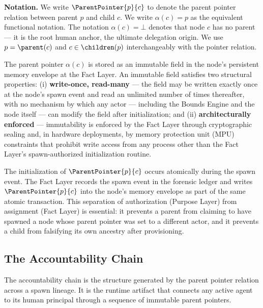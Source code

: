 \noindent\textbf{Notation.} We write $\ParentPointer{p}{c}$ to denote the parent pointer relation between parent $p$ and child $c$. We write $\alpha(c) = p$ as the equivalent functional notation. The notation $\alpha(c) = \bot$ denotes that node $c$ has no parent --- it is the root human anchor, the ultimate delegation origin. We use $p = \parent(c)$ and $c \in \children(p)$ interchangeably with the pointer relation.

The parent pointer $\alpha(c)$ is stored as an immutable field in the node's persistent memory envelope at the Fact Layer. An immutable field satisfies two structural properties: (i) \textbf{write-once, read-many} --- the field may be written exactly once at the node's spawn event and read an unlimited number of times thereafter, with no mechanism by which any actor --- including the Bounds Engine and the node itself --- can modify the field after initialization; and (ii) \textbf{architecturally enforced} --- immutability is enforced by the Fact Layer through cryptographic sealing and, in hardware deployments, by memory protection unit (MPU) constraints that prohibit write access from any process other than the Fact Layer's spawn-authorized initialization routine.

The initialization of $\ParentPointer{p}{c}$ occurs atomically during the spawn event. The Fact Layer records the spawn event in the forensic ledger and writes $\ParentPointer{p}{c}$ into the node's memory envelope as part of the same atomic transaction. This separation of authorization (Purpose Layer) from assignment (Fact Layer) is essential: it prevents a parent from claiming to have spawned a node whose parent pointer was set to a different actor, and it prevents a child from falsifying its own ancestry after provisioning.

\subsection{The Accountability Chain}
\label{sec:rs-accountability-chain}

The accountability chain is the structure generated by the parent pointer relation across a spawn lineage. It is the runtime artifact that connects any active agent to its human principal through a sequence of immutable parent pointers.

